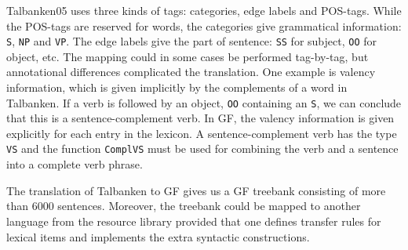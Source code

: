\documentclass[runningheads,a4paper]{llncs}
\begin{document}
Talbanken05 uses three kinds of tags: categories, edge labels and POS-tags. 
While the POS-tags are reserved for words, the categories give grammatical information:
 \verb|S|, \verb|NP| and \verb|VP|.
The edge labels give the part of sentence: \verb|SS| for subject, 
\verb|OO| for object, etc. 
%
The mapping could in some cases be performed tag-by-tag, but annotational
differences complicated the translation.
One example is valency information, which is given implicitly by the complements
of a word in Talbanken. If a verb is followed by an object, \verb-OO- containing an
\verb-S-, we can conclude that this is a sentence-complement verb.
In GF, the valency information is given explicitly for each entry in the lexicon.
A sentence-complement verb has the type \verb-VS- and the 
function \verb-ComplVS-  must be used for combining the verb and  a 
sentence into a complete verb phrase.

The translation of Talbanken to GF gives us a GF treebank consisting of more than
6000 sentences.
Moreover, the treebank could be mapped to another language from the 
resource library provided that one defines transfer rules for lexical
items and implements the extra syntactic constructions.
\end{document}
